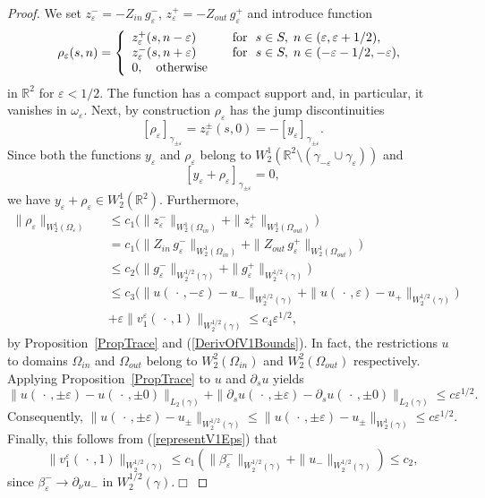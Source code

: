 \documentclass[graybox]{svmult}
\newcommand{\Real}{\mathbb R}
\newcommand{\eps}{\varepsilon}
\renewcommand{\leq}{\leqslant}
\newcommand{\eqref}[1]{(\ref{#1})}
\begin{document}
\begin{proof}
We set $z_\eps^-=-Z_{in}\, g_\eps^-$, $z_\eps^+=-Z_{out}\, g_\eps^+$ and introduce  function
\begin{equation}\label{RhoEps}
\rho_\eps(s, n)=
\left\{
  \begin{array}{ll}
    z_\eps^+(s,n-\eps)&\quad \hbox{for \ }
                  s\in S, \; n\in (\eps, \eps+1/2 ), \\
    z_\eps^-(s,n+\eps)&\quad \hbox{for \ }
               s\in S, \; n\in (-\eps-1/2,-\eps), \\
   0,\quad \hbox{otherwise}
  \end{array}
\right.
\end{equation}
in  $\Real^2$ for $\eps<1/2$.
The function has a compact support and,  in particular, it vanishes in $\omega_\eps$.
Next, by construction $\rho_\eps$ has the jump discontinuities
$$
  [\rho_\eps]_{\gamma_{\pm\eps}}=z_\eps^\pm(s,0)=-[y_\eps]_{\gamma_{\pm\eps}}.
$$
Since both the functions $y_\eps$ and $\rho_\eps$ belong to $W_2^1(\Real^2\setminus(\gamma_{-\eps}\cup \gamma_\eps))$
and
$$
 [y_\eps+\rho_\eps]_{\gamma_{\pm\eps}}=0,
$$
we have $y_\eps+\rho_\eps\in W_2^1(\Real^2)$. Furthermore,
\begin{eqnarray}\nonumber
\|\rho_\eps\|_{W_2^1(\Omega_\eps)}&&\leq c_1\big( \|z_\eps^-\|_{W_2^1(\Omega_{in})} +\|z_\eps^+\|_{W_2^1(\Omega_{out})}\big)\\\nonumber
&&=c_1\big(\|Z_{in}\,  g_\eps^-\|_{W_2^1(\Omega_{in})} +
\|Z_{out}\, g_\eps^+\|_{W_2^1(\Omega_{out})}\big)\\\nonumber
&&\leq c_2\big(\|g_\eps^-\|_{W_2^{1/2}(\gamma)}
+\|g_\eps^+\|_{W_2^{1/2}(\gamma)}\big)\\\nonumber
&&\leq c_3\big(\|u(\,\cdot\,,-\eps)-u_-\|_{W_2^{1/2}(\gamma)}
+\|u(\,\cdot\,,\eps)-u_+\|_{W_2^{1/2}(\gamma)}\big)\\\nonumber
&&
+\eps \|v_1^\eps(\,\cdot\,,1)\|_{W_2^{1/2}(\gamma)}\leq c_4\eps^{1/2},
\end{eqnarray}
by Proposition~\ref{PropTrace} and \eqref{DerivOfV1Bounds}. In fact, the restrictions $u$ to domains $\Omega_{in}$ and $\Omega_{out}$ belong to $W_2^2(\Omega_{in})$ and $W_2^2(\Omega_{out})$ respectively. Applying Proposition~\ref{PropTrace} to $u$ and $\partial_su$ yields
$$
   \|u(\,\cdot\,,\pm\eps)-u(\,\cdot\,,\pm0)\|_{L_2(\gamma)}+
   \|\partial_s u(\,\cdot\,,\pm\eps)-\partial_s u(\,\cdot\,,\pm0)\|_{L_2(\gamma)}\leq c\eps^{1/2}.
$$
Consequently,
$
  \|u(\,\cdot\,,\pm\eps)-u_\pm\|_{W_2^{1/2}(\gamma)}\leq \|u(\,\cdot\,,\pm\eps)-u_\pm\|_{W_2^{1}(\gamma)}\leq c\eps^{1/2}
$.
Finally, this follows from \eqref{representV1Eps} that
$$
 \|v_1^\eps(\,\cdot\,,1)\|_{W_2^{1/2}(\gamma)}\leq c_1(\|\beta_\eps^-\|_{W_2^{1/2}(\gamma)}+\|u_-\|_{W_2^{1/2}(\gamma)})\leq c_2,
$$
since $\beta_\eps^-\to  \partial_\nu u_-$ in $W_2^{1/2}(\gamma)$.\hfill$\Box$
\end{proof}
\end{document}
